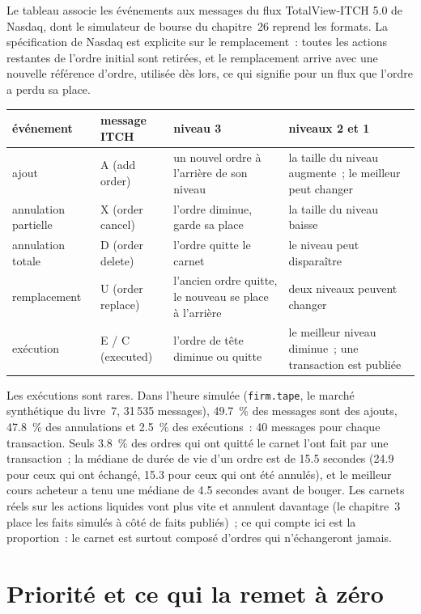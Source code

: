 Le tableau associe les événements aux messages du flux TotalView-ITCH 5.0 de Nasdaq, dont le simulateur de bourse
du chapitre~26 reprend les formats. La spécification de Nasdaq est explicite sur le remplacement~: toutes les actions restantes de l'ordre initial sont retirées, et le
remplacement arrive avec une nouvelle référence d'ordre, utilisée dès lors, ce qui signifie pour un flux que l'ordre a perdu sa place.

\begin{center}
\small
\begin{tabular}{@{}llp{4.3cm}p{4.3cm}@{}}
\toprule
événement & message ITCH & niveau 3 & niveaux 2 et 1 \\
\midrule
ajout & A (add order) & un nouvel ordre à l'arrière de son niveau & la taille du niveau augmente~; le meilleur peut changer \\
annulation partielle & X (order cancel) & l'ordre diminue, garde sa place & la taille du niveau baisse \\
annulation totale & D (order delete) & l'ordre quitte le carnet & le niveau peut disparaître \\
remplacement & U (order replace) & l'ancien ordre quitte, le nouveau se place à l'arrière & deux niveaux peuvent changer \\
exécution & E / C (executed) & l'ordre de tête diminue ou quitte & le meilleur niveau diminue~; une transaction est publiée \\
\bottomrule
\end{tabular}
\end{center}

Les exécutions sont rares. Dans l'heure simulée (\texttt{firm.tape}, le marché synthétique du livre~7, 31\,535 messages), 49.7~\% des messages sont des ajouts,
47.8~\% des annulations et 2.5~\% des exécutions~: 40 messages pour chaque transaction. Seuls 3.8~\% des ordres qui ont quitté le carnet l'ont fait par une transaction~; la médiane
de durée de vie d'un ordre est de 15.5 secondes (24.9 pour ceux qui ont échangé, 15.3 pour ceux qui ont été annulés), et le meilleur cours acheteur a tenu une médiane de 4.5 secondes avant
de bouger. Les carnets réels sur les actions liquides vont plus vite et annulent davantage (le chapitre~3 place les faits simulés à côté de faits publiés)~; ce qui compte ici est la
proportion~: le carnet est surtout composé d'ordres qui n'échangeront jamais.

\section{Priorité et ce qui la remet à zéro}

